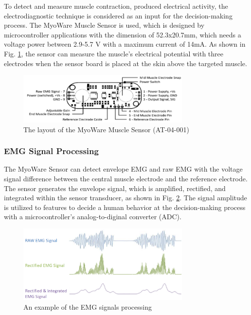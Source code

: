 \documentclass[conference]{IEEEtran}
\begin{document}
To detect and measure muscle contraction, produced electrical activity, the electrodiagnostic technique is considered as an input for the decision-making process. The MyoWare Muscle Sensor is used, which is designed by microcontroller applications \cite{myo} with the dimension of 52.3x20.7mm, which needs a voltage power between 2.9-5.7 V with a maximum current of 14mA. As shown in Fig. \ref{myo}, the sensor can measure the muscle's electrical potential with three electrodes when the sensor board is placed at the skin above the targeted muscle.

\begin{figure}[h]
  \centering
  \includegraphics[width=3.4in]{myosensor.png}
  \caption{The layout of the MyoWare Muscle Sensor (AT-04-001)}
  \label{myo}
\end{figure}


\subsubsection{EMG Signal Processing}

The MyoWare Sensor can detect envelope EMG and raw EMG with the voltage signal difference between the central muscle electrode and the reference electrode. The sensor generates the envelope signal, which is amplified, rectified, and integrated within the sensor transducer, as shown in Fig. \ref{signal}. The signal amplitude is utilized to features to decide a human behavior at the decision-making process with a microcontroller's analog-to-diginal converter (ADC).

\begin{figure}[h]
  \centering
  \includegraphics[width=3.4in]{signals.png}
  \caption{An example of the EMG signals processing}
  \label{signal}
\end{figure}
\end{document}
